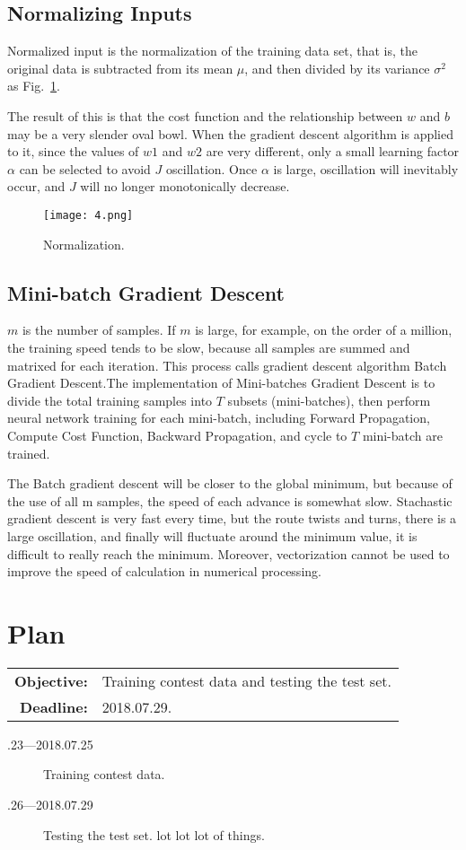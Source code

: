 \documentclass[a4paper]{article}
\begin{document}
\subsection{Normalizing Inputs}
Normalized input is the normalization of the training data set, that is, the original data is subtracted from its mean $\mu$, and then divided by its variance $\sigma^2$ as Fig.~\ref{6}.
\par
The result of this is that the cost function and the relationship between $w$ and $b$ may be a very slender oval bowl. When the gradient descent algorithm is applied to it, since the values of $w1$ and $w2$ are very different, only a small learning factor $\alpha$ can be selected to avoid $J$ oscillation. Once $\alpha$ is large, oscillation will inevitably occur, and $J$ will no longer monotonically decrease.
\begin{figure}[h]
\begin{center}
  \texttt{[image: 4.png]}\\
  \caption{Normalization.}\label{6}
\end{center}
\end{figure}
\subsection{Mini-batch Gradient Descent}
$m$ is the number of samples. If $m$ is large, for example, on the order of a million, the training speed tends to be slow, because all samples are summed and matrixed for each iteration. This process calls gradient descent algorithm Batch Gradient Descent.The implementation of Mini-batches Gradient Descent is to divide the total training samples into $T$ subsets (mini-batches), then perform neural network training for each mini-batch, including Forward Propagation, Compute Cost Function, Backward Propagation, and cycle to $T$ mini-batch are trained. 
\par
The Batch gradient descent will be closer to the global minimum, but because of the
use of all m samples, the speed of each advance is somewhat slow. Stachastic gradient descent is very fast
every time, but the route twists and turns, there is a large oscillation, and finally will fluctuate around the minimum value, it is difficult to really reach the minimum. Moreover, vectorization cannot be used to improve the speed of calculation in numerical processing.
\section{Plan}
\begin{tabular}{rl}
	\textbf{Objective:} & Training contest data and testing the test set. \\
    \textbf{Deadline:} & 2018.07.29.
\end{tabular}
\begin{description}
    \item[.23---2018.07.25] Training contest data.
    \item[.26---2018.07.29] Testing the test set.
    lot lot lot of things.
\end{description}
{\small


}
\end{document}
